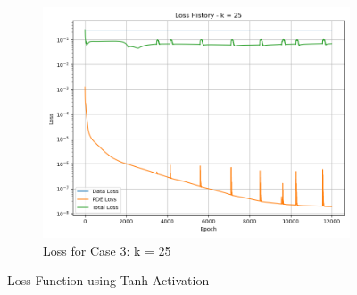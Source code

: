 \documentclass[11pt]{article}
\begin{document}
\begin{figure}[h!]
\begin{subfigure}[b]{0.48\textwidth}
        \includegraphics[width=\textwidth]{2D_Loss_K3.png}
        \caption{Loss for Case 3: k = 25}
        \label{fig:Loss_K3}
    \end{subfigure}
    \caption{Loss Function using Tanh Activation}
    \label{fig:Loss_Tanh}
\end{figure}
\pagebreak
\end{document}
